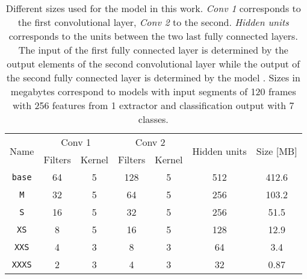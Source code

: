 \begin{table}
    \centering
    \begin{tabular}{|c|c|c|c|c|c|c|}
        \hline
        \multirow{2}{*}{Name}
                      & \multicolumn{2}{c|}{Conv 1}

        
        
                      & \multicolumn{2}{c|}{Conv 2}

        
        
                      & \multirow{2}{*}{Hidden units}

        
        
                      & \multirow{2}{*}{Size [MB]}                                              \\
        \cline{2-5}
                      & Filters                       & Kernel & Filters & Kernel &     &       \\
        \hline
        \hline
        \texttt{base} & 64                            & 5      & 128     & 5      & 512 & 412.6 \\\hline
        \texttt{M}    & 32                            & 5      & 64      & 5      & 256 & 103.2 \\\hline
        \texttt{S}    & 16                            & 5      & 32      & 5      & 256 & 51.5  \\\hline
        \texttt{XS}   & 8                             & 5      & 16      & 5      & 128 & 12.9  \\\hline
        \texttt{XXS}  & 4                             & 3      & 8       & 3      & 64  & 3.4   \\\hline
        \texttt{XXXS} & 2                             & 3      & 4       & 3      & 32  & 0.87  \\\hline
    \end{tabular}
    \caption[Model sizes]{Different sizes used for the model
         in this work. \emph{Conv 1}
        corresponds to the first convolutional layer, \emph{Conv 2} to the
        second. \emph{Hidden units} corresponds to the units between the two
        last fully connected layers. The input of the first fully connected
        layer is determined by the output elements of the second convolutional
        layer while the output of the second fully connected layer is
        determined by the model . Sizes in megabytes
        correspond to models with input segments of 120 frames with 256
        features from 1 extractor and classification output with 7 classes. }
    \label{table:model-arch-sizes}
\end{table}

